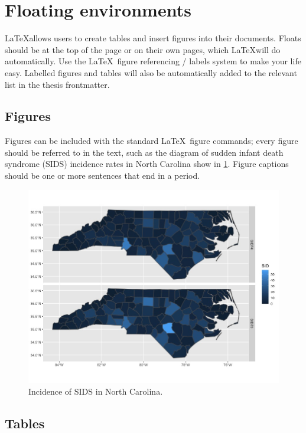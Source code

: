 \lipsum[3]

\section{Floating environments}

\LaTeX allows users to create tables and insert figures into their documents.
Floats should be at the top of the page or on their own pages, which \LaTeX will
do automatically. Use the \LaTeX \ figure referencing / labels system to make your life easy. Labelled figures and tables will also be automatically
added to the relevant list in the thesis frontmatter.

\subsection{Figures}

Figures
can be included with the standard \LaTeX \ figure commands; every figure should
be referred to in the text, such as the diagram of sudden infant death
syndrome (SIDS) incidence rates in North Carolina show in \ref{fig:ncplot}.
Figure captions should be one or more
sentences that end in a period.

\begin{figure}
  \includegraphics[width=\textwidth]{./images/ncplot}
  \caption{\label{fig:ncplot} Incidence of SIDS in North Carolina.}
\end{figure}


\subsection{Tables}

